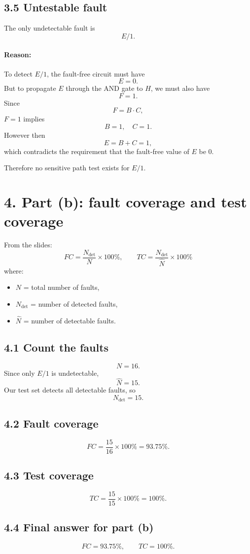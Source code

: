 \documentclass[11pt,a4paper]{article}
\begin{document}
\subsection*{3.5 Untestable fault}
The only undetectable fault is
\[
\boxed{E/1}.
\]

\paragraph{Reason:}
To detect $E/1$, the fault-free circuit must have
\[
E=0.
\]
But to propagate $E$ through the AND gate to $H$, we must also have
\[
F=1.
\]
Since
\[
F=B\cdot C,
\]
$F=1$ implies
\[
B=1,\quad C=1.
\]
However then
\[
E=B+C=1,
\]
which contradicts the requirement that the fault-free value of $E$ be 0.

Therefore no sensitive path test exists for $E/1$.

\section*{4. Part (b): fault coverage and test coverage}
From the slides:
\[
FC=\frac{N_{\text{det}}}{N}\times 100\%,\qquad
TC=\frac{N_{\text{det}}}{\hat{N}}\times 100\%
\]
where:
\begin{itemize}
  \item $N$ = total number of faults,
  \item $N_{\text{det}}$ = number of detected faults,
  \item $\hat{N}$ = number of detectable faults.
\end{itemize}

\subsection*{4.1 Count the faults}
\[
N=16.
\]
Since only $E/1$ is undetectable,
\[
\hat{N}=15.
\]
Our test set detects all detectable faults, so
\[
N_{\text{det}}=15.
\]

\subsection*{4.2 Fault coverage}
\[
FC=\frac{15}{16}\times 100\%=93.75\%.
\]

\subsection*{4.3 Test coverage}
\[
TC=\frac{15}{15}\times 100\%=100\%.
\]

\subsection*{4.4 Final answer for part (b)}
\[
\boxed{FC=93.75\%,\qquad TC=100\%.}
\]
\end{document}
